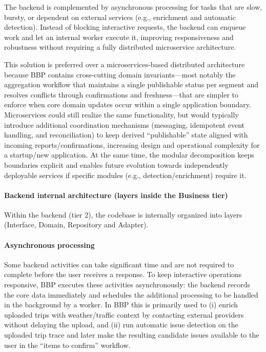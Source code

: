 The backend is complemented by asynchronous processing for tasks that are slow, bursty, or dependent on external services (e.g., enrichment and automatic detection). Instead of blocking interactive requests, the backend can enqueue work and let an internal worker execute it, improving responsiveness and robustness without requiring a fully distributed microservice architecture.

This solution is preferred over a microservices-based distributed architecture because BBP contains cross-cutting domain invariants—most notably the aggregation workflow that maintains a single publishable status per segment and resolves conflicts through confirmations and freshness—that are simpler to enforce when core domain updates occur within a single application boundary. Microservices could still realize the same functionality, but would typically introduce additional coordination mechanisms (messaging, idempotent event handling, and reconciliation) to keep derived “publishable” state aligned with incoming reports/confirmations, increasing design and operational complexity for a startup/new application. At the same time, the modular decomposition keeps boundaries explicit and enables future evolution towards independently deployable services if specific modules (e.g., detection/enrichment) require it.

\paragraph{Backend internal architecture (layers inside the Business tier)}
Within the backend (tier 2), the codebase is internally organized into layers (Interface, Domain, Repository and Adapter).

\paragraph{Asynchronous processing}
Some backend activities can take significant time and are not required to complete before the user receives a response. To keep interactive operations responsive, BBP executes these activities asynchronously: the backend records the core data immediately and schedules the additional processing to be handled in the background by a worker. In BBP this is primarily used to (i) enrich uploaded trips with weather/traffic context by contacting external providers without delaying the upload, and (ii) run automatic issue detection on the uploaded trip trace and later make the resulting candidate issues available to the user in the “items to confirm” workflow.

